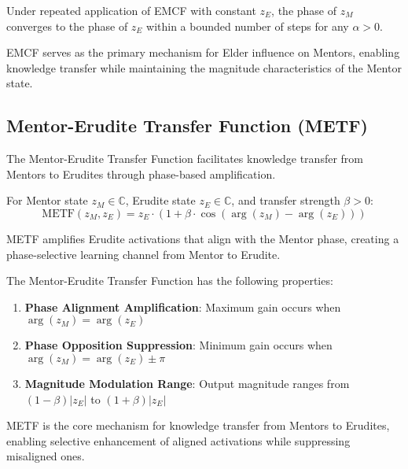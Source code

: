 \begin{proposition}
Under repeated application of EMCF with constant $z_E$, the phase of $z_M$ converges to the phase of $z_E$ within a bounded number of steps for any $\alpha > 0$.
\end{proposition}

EMCF serves as the primary mechanism for Elder influence on Mentors, enabling knowledge transfer while maintaining the magnitude characteristics of the Mentor state.

\subsection{Mentor-Erudite Transfer Function (METF)}

The Mentor-Erudite Transfer Function facilitates knowledge transfer from Mentors to Erudites through phase-based amplification.

\begin{definition}
For Mentor state $z_M \in \mathbb{C}$, Erudite state $z_E \in \mathbb{C}$, and transfer strength $\beta > 0$:
\begin{equation}
\text{METF}(z_M, z_E) = z_E \cdot (1 + \beta \cdot \cos(\arg(z_M) - \arg(z_E)))
\end{equation}
\end{definition}

METF amplifies Erudite activations that align with the Mentor phase, creating a phase-selective learning channel from Mentor to Erudite.

\begin{proposition}
The Mentor-Erudite Transfer Function has the following properties:
\begin{enumerate}
    \item \textbf{Phase Alignment Amplification}: Maximum gain occurs when $\arg(z_M) = \arg(z_E)$
    \item \textbf{Phase Opposition Suppression}: Minimum gain occurs when $\arg(z_M) = \arg(z_E) \pm \pi$
    \item \textbf{Magnitude Modulation Range}: Output magnitude ranges from $(1-\beta)|z_E|$ to $(1+\beta)|z_E|$
\end{enumerate}
\end{proposition}

METF is the core mechanism for knowledge transfer from Mentors to Erudites, enabling selective enhancement of aligned activations while suppressing misaligned ones.

